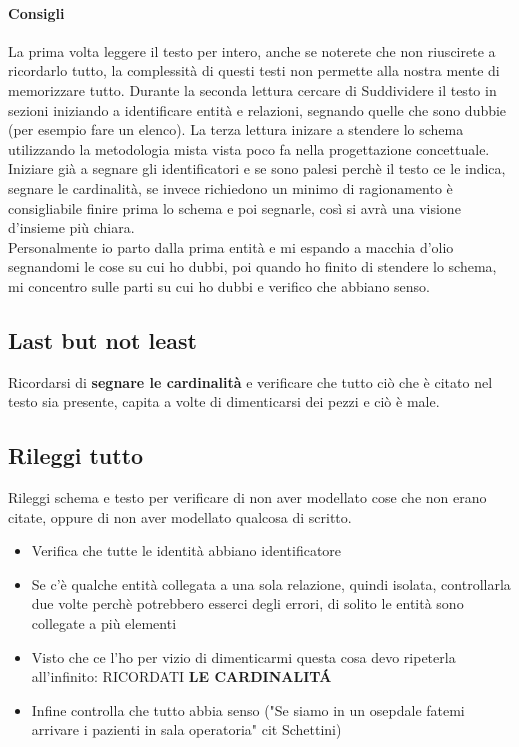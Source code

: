 \paragraph*{Consigli} La prima volta leggere il testo per intero, anche se noterete
che non riuscirete a ricordarlo tutto, la complessità di questi testi non permette
alla nostra mente di memorizzare tutto. Durante la seconda lettura cercare di Suddividere
il testo in sezioni iniziando a identificare entità e relazioni, segnando quelle che sono
dubbie (per esempio fare un elenco). La terza lettura inizare a stendere lo schema
utilizzando la metodologia mista vista poco fa nella progettazione concettuale.
\\ Iniziare già a segnare gli identificatori e se sono palesi perchè il testo ce le
indica, segnare le cardinalità, se invece richiedono un minimo di ragionamento è consigliabile
finire prima lo schema e poi segnarle, così si avrà una visione d'insieme più chiara.
\\ Personalmente io parto dalla prima entità e mi espando a macchia d'olio segnandomi
le cose su cui ho dubbi, poi quando ho finito di stendere lo schema, mi concentro sulle
parti su cui ho dubbi e verifico che abbiano senso.
\subsection*{Last but not least}
Ricordarsi di \textbf{segnare le cardinalità} e verificare che tutto ciò che è
citato nel testo sia presente, capita a volte di dimenticarsi dei pezzi e ciò è male.
\subsection*{Rileggi tutto}
Rileggi schema e testo per verificare di non aver modellato cose che non erano citate, oppure
di non aver modellato qualcosa di scritto. 
\begin{itemize}
    \item Verifica che tutte le identità abbiano identificatore
    \item Se c'è qualche entità collegata a una sola relazione, quindi isolata, controllarla
    due volte perchè potrebbero esserci degli errori, di solito le entità sono collegate a più elementi
    \item Visto che ce l'ho per vizio di dimenticarmi questa cosa devo ripeterla all'infinito:
    RICORDATI \textbf{LE CARDINALIT\'A}
    \item Infine controlla che tutto abbia senso ("Se siamo in un osepdale fatemi arrivare i pazienti
    in sala operatoria" cit Schettini)
\end{itemize}
